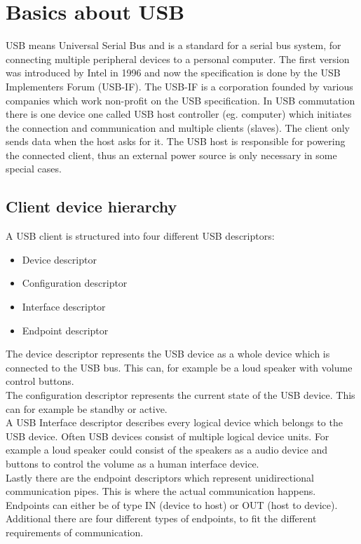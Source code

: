 \chapter{Basics about USB}

USB means Universal Serial Bus and is a standard for a serial bus system, for connecting multiple peripheral devices to a personal computer. The first version was introduced by Intel in 1996 and now the specification is done by the USB Implementers Forum (USB-IF). The USB-IF is a corporation founded by various companies which work non-profit on the USB specification. In USB commutation there is one device one called USB host controller (eg. computer) which initiates the connection and communication and multiple clients (slaves). The client only sends data when the host asks for it. The USB host is responsible for powering the connected client, thus an external power source is only necessary in some special cases\cite{wiki_usb}.

\section{Client device hierarchy}

A USB client is structured into four different USB descriptors:

\begin{itemize}
\item Device descriptor
\item Configuration descriptor
\item Interface descriptor
\item Endpoint descriptor
\end{itemize}

The device descriptor represents the USB device as a whole device which is connected to the USB bus. This can, for example be a loud speaker with volume control buttons.\\
The configuration descriptor represents the current state of the USB device. This can for example be standby or active.\\
A USB Interface descriptor describes every logical device which belongs to the USB device. Often USB devices consist of multiple logical device units. For example a loud speaker could consist of the speakers as a audio device and buttons to control the volume as a human interface device. \\
Lastly there are the endpoint descriptors which represent unidirectional communication pipes. This is where the actual communication happens. Endpoints can either be of type IN (device to host) or OUT (host to device). Additional there are four different types of endpoints, to fit the different requirements of communication\cite{free_usb}.\\

